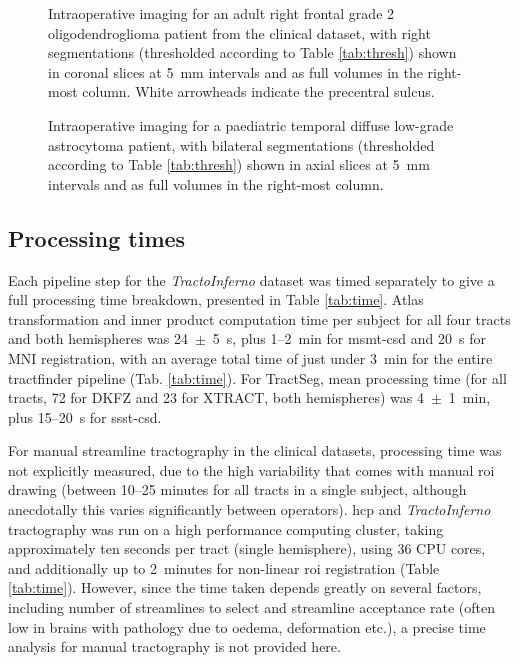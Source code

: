 \documentclass[12pt,phd,a4paper,twoside]{ucl_thesis}
\begin{document}
\begin{figure}[htb!]
  \makebox[\linewidth][r]{}
  \caption[CST segmentations in all benchmark evaluation methods for an adult intraoperative case in the clinical dataset]{Intraoperative imaging for an adult right frontal  grade 2 oligodendroglioma patient from the clinical dataset, with right  segmentations (thresholded according to Table \ref{tab:thresh}) shown in coronal slices at 5~mm intervals and as full volumes in the right-most column. White arrowheads indicate the precentral sulcus.}
  \label{fig:lb.nh}
\end{figure}
\begin{figure}[htb!]
  \makebox[\linewidth][r]{}
  \caption[OR segmentations in all benchmark evaluation methods for a paediatric intraoperative case in the clinical dataset]{Intraoperative imaging for a paediatric temporal diffuse low-grade astrocytoma patient, with bilateral  segmentations (thresholded according to Table \ref{tab:thresh}) shown in axial slices at 5~mm intervals and as full volumes in the right-most column.}
  \label{fig:lb.gosh}
\end{figure}



\subsection{Processing times}

Each pipeline step for the \textit{TractoInferno} dataset was timed separately to give a full processing time breakdown, presented in Table \ref{tab:time}.
Atlas transformation and inner product computation time per subject for all four tracts and both hemispheres was 24~$\pm$~5~s, plus 1--2~min for \gls{msmt}-\gls{csd} and 20~s for MNI registration, with an average total time of just under 3~min for the entire tractfinder pipeline (Tab. \ref{tab:time}).
For TractSeg, mean processing time (for all tracts, 72 for DKFZ and 23 for XTRACT, both hemispheres) was 4~$\pm$~1~min, plus 15--20~s for \gls{ssst}-\gls{csd}.

For manual streamline tractography in the clinical datasets, processing time was not explicitly measured, due to the high variability that comes with manual \gls{roi} drawing (between 10--25 minutes for all tracts in a single subject, although anecdotally this varies significantly between operators).
\Gls{hcp} and \textit{TractoInferno} tractography was run on a high performance computing cluster, taking approximately ten seconds per tract (single hemisphere), using 36 CPU cores, and additionally up to 2~minutes for non-linear \gls{roi} registration (Table \ref{tab:time}).
However, since the time taken depends greatly on several factors, including number of streamlines to select and streamline acceptance rate (often low in brains with pathology due to oedema, deformation etc.), a precise time analysis for manual tractography is not provided here.
\end{document}
